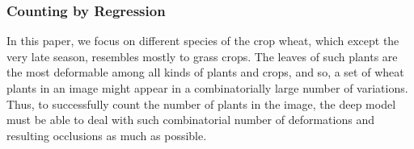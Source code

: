 \documentclass[10pt,twocolumn,letterpaper]{article}
\begin{document}
%

\subsubsection{Counting by Regression}

In this paper, we focus on different species of the crop wheat, which except the very late season, resembles mostly to grass crops. The leaves of such plants are the most deformable among all kinds of plants and crops, and so, a set of wheat plants in an image might appear in a combinatorially large number of variations. Thus, to successfully count the number of plants in the image, the deep model must be able to deal with such combinatorial number of deformations and resulting occlusions as much as possible.
\end{document}
